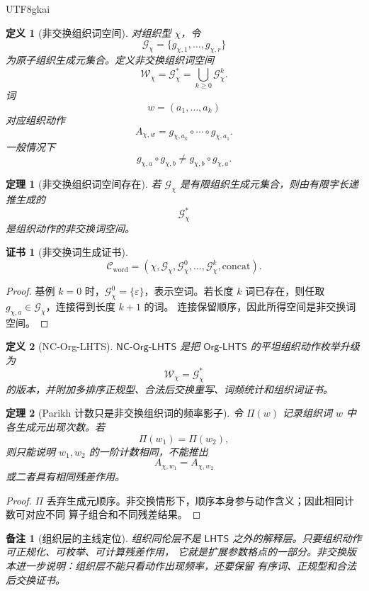 \documentclass[12pt]{article}
\newtheorem{definition}{定义}[section]
\newtheorem{theorem}{定理}[section]
\newtheorem{remark}{备注}[section]
\newtheorem{Certificate}{证书}[section]
\newcommand{\LHTS}{\ensuremath{\mathsf{LHTS}}}
\newcommand{\OrgLHTS}{\ensuremath{\mathsf{Org\mbox{-}LHTS}}}
\newcommand{\NCOrgLHTS}{\ensuremath{\mathsf{NC\mbox{-}Org\mbox{-}LHTS}}}
\begin{document}
\begin{CJK*}{UTF8}{gkai}
\begin{definition}[非交换组织词空间]
对组织型 \(\chi\)，令
\[
  \mathcal G_\chi=\{g_{\chi,1},\ldots,g_{\chi,r}\}
\]
为原子组织生成元集合。定义非交换组织词空间
\[
  \mathcal W_\chi
  =
  \mathcal G_\chi^\ast
  =
  \bigcup_{k\ge0}\mathcal G_\chi^k .
\]
词
\[
  w=(a_1,\ldots,a_k)
\]
对应组织动作
\[
  A_{\chi,w}
  =
  g_{\chi,a_k}\circ\cdots\circ g_{\chi,a_1}.
\]
一般情况下
\[
  g_{\chi,a}\circ g_{\chi,b}
  \ne
  g_{\chi,b}\circ g_{\chi,a}.
\]
\end{definition}

\begin{theorem}[非交换组织词空间存在]
若 \(\mathcal G_\chi\) 是有限组织生成元集合，则由有限字长递推生成的
\[
  \mathcal G_\chi^\ast
\]
是组织动作的非交换词空间。
\end{theorem}

\begin{Certificate}[非交换词生成证书]
\[
  \mathcal C_{\mathrm{word}}
  =
  \left(
  \chi,
  \mathcal G_\chi,
  \mathcal G_\chi^0,
  \ldots,
  \mathcal G_\chi^k,
  \mathrm{concat}
  \right).
\]
\end{Certificate}

\begin{proof}
基例 \(k=0\) 时，\(\mathcal G_\chi^0=\{\varepsilon\}\)，表示空词。若长度 \(k\)
词已存在，则任取 \(g_{\chi,a}\in\mathcal G_\chi\)，连接得到长度 \(k+1\) 的词。
连接保留顺序，因此所得空间是非交换词空间。
\end{proof}

\begin{definition}[NC-Org-LHTS]
\NCOrgLHTS{} 是把 \OrgLHTS{} 的平坦组织动作枚举升级为
\[
  \mathcal W_\chi=\mathcal G_\chi^\ast
\]
的版本，并附加多排序正规型、合法后交换重写、词频统计和组织词证书。
\end{definition}

\begin{theorem}[Parikh 计数只是非交换组织词的频率影子]
令 \(\Pi(w)\) 记录组织词 \(w\) 中各生成元出现次数。若
\[
  \Pi(w_1)=\Pi(w_2),
\]
则只能说明 \(w_1,w_2\) 的一阶计数相同，不能推出
\[
  A_{\chi,w_1}=A_{\chi,w_2}
\]
或二者具有相同残差作用。
\end{theorem}

\begin{proof}
\(\Pi\) 丢弃生成元顺序。非交换情形下，顺序本身参与动作含义；因此相同计数可对应不同
算子组合和不同残差结果。
\end{proof}

\begin{remark}[组织层的主线定位]
组织同伦层不是 \LHTS{} 之外的解释层。只要组织动作可正规化、可枚举、可计算残差作用，
它就是扩展参数格点的一部分。非交换版本进一步说明：组织层不能只看动作出现频率，还要保留
有序词、正规型和合法后交换证书。
\end{remark}


\end{CJK*}
\end{document}

